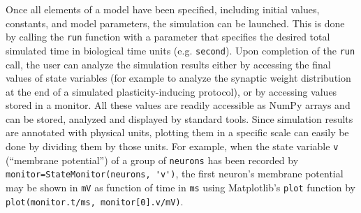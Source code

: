 \documentclass[a4paper, 11pt]{article}
\begin{document}
Once all elements of a model have been specified, including initial values, constants, and model parameters, the simulation can be launched.
This is done by calling the \lstinline|run| function with a parameter that specifies the desired total simulated time in biological time units (e.g. \lstinline|second|).
Upon completion of the \lstinline|run| call, the user can analyze the simulation results either by accessing the final values of state variables (for example to analyze the synaptic weight distribution at the end of a simulated plasticity-inducing protocol), or by accessing values stored in a monitor.
All these values are readily accessible as NumPy arrays \citep{Numpy2011} and can be stored, analyzed and displayed by standard tools.
Since simulation results are annotated with physical units, plotting them in a specific scale can easily be done by dividing them by those units.
For example, when the state variable \lstinline|v| (``membrane potential'') of a group of \lstinline|neurons| has been recorded by \lstinline|monitor=StateMonitor(neurons, 'v')|, the first neuron's membrane potential may be shown in \lstinline|mV| as function of time in \lstinline|ms| using Matplotlib's \citep{Matplotlib2007} \lstinline|plot| function by \lstinline|plot(monitor.t/ms, monitor[0].v/mV)|.
\end{document}

